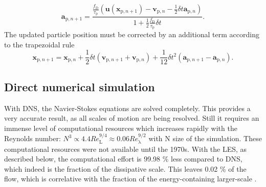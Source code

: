 \documentclass[11pt,a4paper,openany,oneside,parskip=half*]{article}
\renewcommand*\vec[1]{\boldsymbol{#1}}
\begin{document}
\begin{equation}
\vec{a}_{\mathrm{p}, n+1} = \frac{\frac{f_\mathrm{D}}{\tau_\mathrm{p}} \left(\vec{u}(\vec{x}_{\mathrm{p}, n+1}) - \vec{v}_{\mathrm{p}, n} - \frac{1}{2} \delta t \vec{a}_{\mathrm{p}, n} \right)}{1 + \frac{1}{2} \frac{f_\mathrm{D}}{\tau_\mathrm{p}} \delta t}.
\end{equation}
The updated particle position must be corrected by an additional term according to the trapezoidal rule
\begin{equation}
\vec{x}_{\mathrm{p}, n+1} = \vec{x}_{\mathrm{p}, n} + \frac{1}{2} \delta t \left( \vec{v}_{\mathrm{p}, n+1} + \vec{v}_{\mathrm{p}, n} \right) + \frac{1}{12} \delta t^2 \left( \vec{a}_{\mathrm{p}, n+1} - \vec{a}_{\mathrm{p}, n} \right).
\end{equation}
\newline
\subsection{Direct numerical simulation}
With DNS, the Navier-Stokes equations are solved completely. This provides a very accurate result, as all scales of motion are being resolved. Still it requires an immense level of computational resources which increases rapidly with the Reynolds number: $N^3 \propto 4.4 Re_{\mathrm{L}}^{9/4} \approx 0.06 Re_{\mathrm{\lambda}}^{9/2}$ with N size of the simulation. These computational resources were not available until the 1970s. With the LES, as described below, the computational effort is 99.98 \% less compared to DNS, which indeed is the fraction of the dissipative scale. This leaves 0.02 \% of the flow, which is correlative with the fraction of the energy-containing larger-scale \cite{turbulentFlows}.%
\newline
\end{document}
